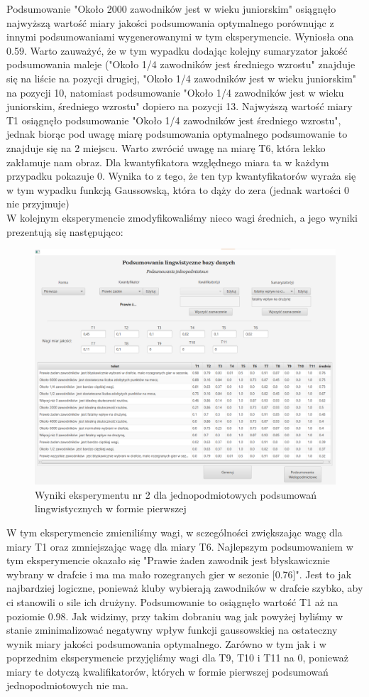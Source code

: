 \documentclass{classrep}
\begin{document}
Podsumowanie "Około 2000 zawodników jest w wieku juniorskim" osiągnęło najwyższą wartość miary jakości podsumowania optymalnego porównując z innymi podsumowaniami wygenerowanymi w tym eksperymencie. Wyniosła ona 0.59. Warto zauważyć, że w tym wypadku dodając kolejny sumaryzator jakość podsumowania maleje ("Około 1/4 zawodników jest średniego wzrostu" znajduje się na liście na pozycji drugiej, "Około 1/4 zawodników jest w wieku juniorskim" na pozycji 10, natomiast podsumowanie "Około 1/4 zawodników jest w wieku juniorskim, średniego wzrostu" dopiero na pozycji 13. Najwyższą wartość miary T1 osiągnęło podsumowanie "Około 1/4 zawodników jest średniego wzrostu", jednak biorąc pod uwagę miarę podsumowania optymalnego podsumowanie to znajduje się na 2 miejscu. Warto zwrócić uwagę na miarę T6, która lekko zakłamuje nam obraz. Dla kwantyfikatora względnego miara ta w każdym przypadku pokazuje 0. Wynika to z tego, że ten typ kwantyfikatorów wyraża się w tym wypadku funkcją Gaussowską, która to dąży do zera (jednak wartości 0 nie przyjmuje)
\\
W kolejnym eksperymencie zmodyfikowaliśmy nieco wagi średnich, a jego wyniki prezentują się następująco: 
\begin{figure}[H]
    \centering
    \includegraphics[width = 14cm]{eksperyment2.png}
    \caption{Wyniki eksperymentu nr 2 dla jednopodmiotowych podsumowań lingwistycznych w formie pierwszej}
    \label{rysunek:forma_pierwsza_eksperyment_2}
\end{figure}
W tym eksperymencie zmieniliśmy wagi, w sczególności zwiększając wagę dla miary T1 oraz zmniejszając wagę dla miary T6. Najlepszym podsumowaniem w tym eksperymencie okazało się "Prawie żaden zawodnik jest błyskawicznie wybrany w drafcie i ma ma mało rozegranych gier w sezonie [0.76]". Jest to jak najbardziej logiczne, ponieważ kluby wybierają zawodników w drafcie szybko, aby ci stanowili o sile ich drużyny. Podsumowanie to osiągnęło wartość T1 aż na poziomie 0.98. Jak widzimy, przy takim dobraniu wag jak powyżej byliśmy w stanie zminimalizować negatywny wpływ funkcji gaussowskiej na ostateczny wynik miary jakości podsumowania optymalnego. Zarówno w tym jak i w poprzednim eksperymencie przyjęliśmy wagi dla T9, T10 i T11 na 0, ponieważ miary te dotyczą kwalifikatorów, których w formie pierwszej podsumowań jednopodmiotowych nie ma.
\end{document}
